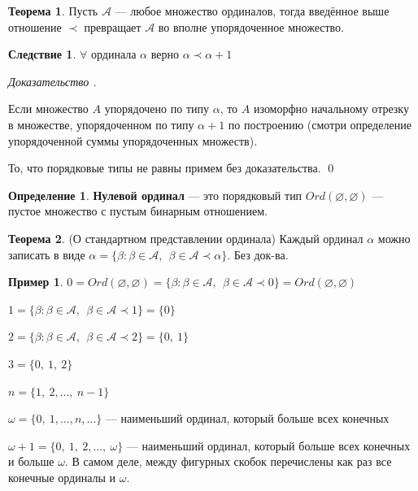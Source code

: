 \documentclass[12pt,oneside]{article}
\theoremstyle{definition}
\newtheorem{definition}{Определение}
\newtheorem{exmp}{Пример}[section]
\newtheorem{theorem}{Теорема}[section]
\newtheorem{corollary}{Следствие}[section]
\newenvironment{ourproof}[1]{\textit{Доказательство #1.}}{\qed}
\begin{document}
\begin{theorem}
Пусть $\mathcal{A}$ --- любое множество ординалов, тогда введённое выше отношение $\prec$ превращает $\mathcal{A}$ во вполне упорядоченное множество.
\end{theorem}
\begin{corollary}\label{coroll_alp_alp1}
$\forall$ ординала $\alpha$ верно $\alpha \prec \alpha + 1$

\begin{ourproof}{}

Если множество $A$ упорядочено по типу $\alpha$, то $A$ изоморфно начальному отрезку в множестве, упорядоченном по типу $\alpha + 1$ по построению (смотри определение упорядоченной суммы упорядоченных множеств).

То, что порядковые типы не равны примем без доказательства.
\end{ourproof}
\end{corollary}

\begin{definition}
\textbf{Нулевой ординал} --- это порядковый тип $Ord(\varnothing ,\varnothing)$ --- пустое множество с пустым бинарным отношением.
\end{definition}

\begin{theorem}\label{stand_ord} (О стандартном представлении ординала) 
Каждый ординал $\alpha$ можно записать в виде $\alpha = \{\beta :\beta\in\mathcal{A},\ \ \beta\in\mathcal{A} \prec \alpha\}$. Без док-ва.
\end{theorem}
\begin{exmp}

$0 = Ord(\varnothing ,\varnothing) = \{\beta :\beta\in\mathcal{A},\ \ \beta\in\mathcal{A} \prec 0\} = Ord(\varnothing ,\varnothing)$

$1 = \{\beta :\beta\in\mathcal{A},\ \ \beta\in\mathcal{A} \prec 1\} = \{0\}$

$2 = \{\beta :\beta\in\mathcal{A},\ \ \beta\in\mathcal{A} \prec 2\} = 
\{0,\ 1\}$

$3 = \{0,\ 1,\ 2\}$

$n = \{1,\ 2,\dots ,\ n-1\}$

$\omega = \{0,\ 1,\dots, n ,\dots \}$ --- наименьший ординал, который больше всех конечных

$\omega + 1 = \{0,\ 1,\ 2,\dots ,\ \omega\}$ --- наименьший ординал, который больше всех конечных и больше $\omega$. В самом деле, между фигурных скобок перечислены как раз все конечные ординалы и $\omega$.
\end{exmp}
\end{document}
